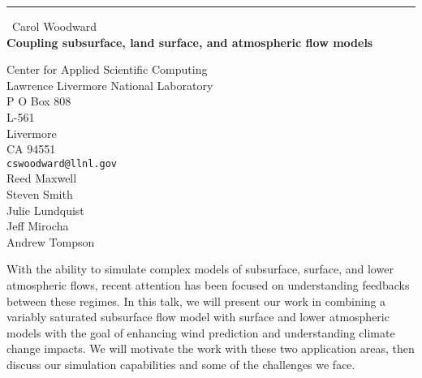 \documentclass{report}
\begin{document}
\begin{center}
\rule{6in}{1pt} \
{\large Carol Woodward \\
{\bf Coupling subsurface, land surface, and atmospheric flow models}}

Center for Applied Scientific Computing \\ Lawrence Livermore National Laboratory \\ P O Box 808 \\ L-561 \\ Livermore \\ CA 94551
\\
{\tt cswoodward@llnl.gov}\\
Reed Maxwell\\
Steven Smith\\
Julie Lundquist\\
Jeff Mirocha\\
Andrew Tompson\end{center}

With the ability to simulate complex models of subsurface, surface, and
lower atmospheric flows, recent attention has been focused on
understanding feedbacks between these regimes. In this talk, we will
present our work in combining a variably saturated subsurface flow model
with surface and lower atmospheric models with the goal of enhancing wind
prediction and understanding climate change impacts. We will motivate the
work with these two application areas, then discuss our simulation
capabilities and some of the challenges we face.
\end{document}
